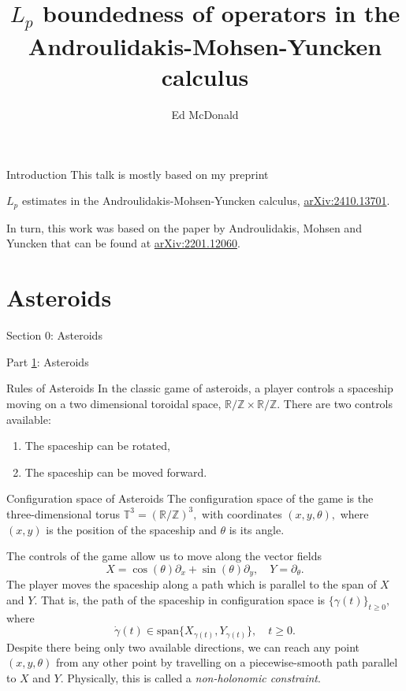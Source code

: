 \documentclass{beamer}
\newcommand\makebeamertitle{\frame{\maketitle}}%
\numberwithin{equation}{section}
\theoremstyle{plain}
\theoremstyle{plain}
\theoremstyle{definition}
\theoremstyle{plain}
\theoremstyle{plain}
\theoremstyle{definition}
\newcommand{\Rl}{\mathbb{R}}
\newcommand{\Itgr}{\mathbb{Z}}
\newcommand{\Circ}{\mathbb{T}}
\begin{document}
\title[$L_p$ estimates in the AMY calculus]{$L_p$ boundedness of operators in the Androulidakis-Mohsen-Yuncken calculus}


\author[E. McDonald]{Ed McDonald}



\makebeamertitle

\begin{frame}{Introduction}
  This talk is mostly based on my preprint
  \begin{center}
    $L_p$ estimates in the Androulidakis-Mohsen-Yuncken calculus, \href{https://arxiv.org/abs/2410.13701}{arXiv:2410.13701}.
  \end{center}
  In turn, this work was based on the paper by Androulidakis, Mohsen and Yuncken that can be found at \href{https://arxiv.org/abs/2201.12060v2}{arXiv:2201.12060}.
\end{frame}



\section{Asteroids}\label{asteroids_section}
\begin{frame}
  \huge{Section 0: Asteroids}
\end{frame}

\begin{frame}
  \Huge{Part \ref{asteroids_section}: Asteroids}
\end{frame}

\begin{frame}{Rules of Asteroids}
  In the classic game of asteroids, a player controls a spaceship moving on a two dimensional toroidal space, $\Rl/\Itgr\times \Rl/\Itgr.$ There are two controls available:
  \begin{enumerate}[{\rm (i)}]
    \item{} The spaceship can be rotated,
    \item{} The spaceship can be moved forward.
  \end{enumerate}
\end{frame}

\begin{frame}{Configuration space of Asteroids}
  The configuration space of the game is the three-dimensional torus $\Circ^3 = (\Rl/\Itgr)^3,$ with coordinates $(x,y,\theta),$ where $(x,y)$ is the position of the spaceship and $\theta$ is its angle.

  The controls of the game allow us to move along the vector fields
  \[
    X = \cos(\theta)\partial_x+\sin(\theta)\partial_y,\quad Y = \partial_\theta.
  \]
  \pause
  The player moves the spaceship along a path which is parallel to the span of $X$ and $Y.$ That is, the path of the spaceship in configuration space is $\{\gamma(t)\}_{t\geq 0},$ where
  \[
    \dot{\gamma}(t) \in \mathrm{span}\{X_{\gamma(t)},Y_{\gamma(t)}\},\quad t\geq 0.
  \]
  \pause
  Despite there being only two available directions, we can reach any point $(x,y,\theta)$ from any other point by travelling on a piecewise-smooth path parallel to $X$ and $Y.$
  \pause
  Physically, this is called a \emph{non-holonomic constraint}.
\end{frame}
\end{document}
